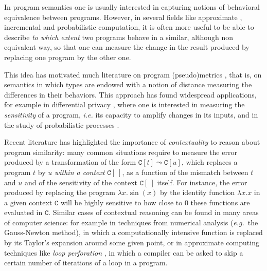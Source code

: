 
In program semantics one is usually interested in capturing notions of behavioral equivalence between programs. However,  in several fields like approximate \cite{Mittal2016}, incremental \cite{Cai2014, Picallo2019} and probabilistic \cite{10.1109/LICS.2015.64} computation, it is often more useful to be able to describe \emph{to which extent}  two programs behave in a similar, although non equivalent way, so that one can measure the change in the result produced by
replacing one program by the other one.



This idea has motivated much literature on program (pseudo)metrics \cite{ARNOLD1980181, VANBREUGEL20011,Azevedo_de_Amorim_2017, Escardo1999, BAIER1994171,10.1109/LICS.2015.64, 10.1007/978-3-662-44584-6_4, 10.1007/978-3-662-54434-1_13, 10.1145/3209108.3209149}, that is, on semantics in which types are endowed with a notion of distance measuring the differences in their behaviors. This approach has found widespread applications, for example in differential privacy \cite{10.1145/1932681.1863568, 10.1007/978-3-642-29420-4_3, Barthe_2012}, where one is interested in measuring the \emph{sensitivity} of a program, \textit{i.e.} its capacity to amplify changes in its inputs, and in the study of probabilistic processes \cite{DESHARNAIS2004323, VANBREUGEL2005115, 10.1007/978-3-662-44584-6_4,10.1007/3-540-48224-5_35}.


Recent literature \cite{chaudhuri, dallago:differential-stlc} has highlighted the importance of \emph{contextuality} to reason about program similarity: many common situations  require to measure the error produced by a transformation of the form $\mathtt C[t] \leadsto \mathtt C[u]$, which replaces a program $t$ by $u$ \emph{within a context} $\mathtt C[\ ]$, as a function of the mismatch between $t$ and $u$ and of the sensitivity of the context $\mathtt C[\ ]$ itself.
 For instance, the error produced by replacing the program $\lambda x.\sin(x)$ by the identity function $\lambda x.x$
  in a given context  $\mathtt C$ will 
  be highly sensitive to how close to $0$  
  these functions are evaluated in $\mathtt C$.
 Similar cases of contextual reasoning can be found  in many areas of computer science: for example 
 in techniques from numerical analysis (\emph{e.g.}~the Gauss-Newton method), in which a 
 computationally intensive function is replaced by its Taylor's expansion {around some given point}, or in {approximate computing} techniques like \emph{loop perforation} \cite{loopperf}, in which a compiler can be asked to skip a certain number of iterations of a loop in a program.

